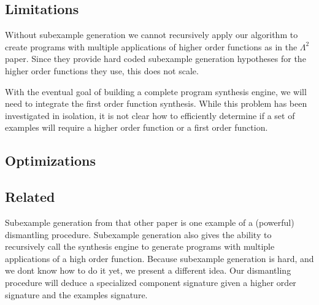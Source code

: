 \subsection{Limitations}

Without subexample generation we cannot recursively apply our algorithm to create programs with multiple applications of higher order functions as in the   $\Lambda^2$ paper\cite{isil}. Since they provide hard coded subexample generation hypotheses for the higher order functions they use, this does not scale.

With the eventual goal of building a complete program synthesis engine, we will need to integrate the first order function synthesis. While this problem has been investigated in isolation, it is not clear how to efficiently determine if  a set of examples will require a higher order function or a first order function.

\subsection{Optimizations}

\subsection{Related}
Subexample generation from that other paper\cite{isil} is one example of a (powerful) dismantling procedure.
Subexample generation also gives the ability to recursively call the synthesis engine to generate programs with multiple applications of a high order function.
Because subexample generation is hard, and we dont know how to do it yet, we present a different idea.
Our dismantling procedure will deduce a specialized component signature given a higher order signature and the examples signature.